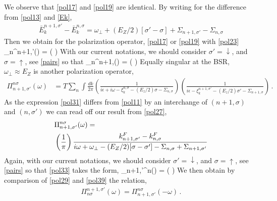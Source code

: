 We observe that \eqref{pol17} and \eqref{pol19} are identical.
By writing for the difference from \eqref{pol13} and \eqref{Ek},
\begin{align}\label{pol23}
\bar{E}_k^{n+1,\sigma'} - \bar{E}_k^{n,\sigma}  = \omega_{\perp} + (E_Z/2)[ \sigma' - \sigma ]
+
\Sigma_{n+1,\sigma'} - \Sigma_{n,\sigma}
\end{align}
Then we obtain for the polarization operator, \eqref{pol17} or \eqref{pol19} with \eqref{pol23}
\be\label{pol27}
\Pi_{n\sigma}^{n+1,\sigma'}(\omega) = \left(  \right)
\ee
With our current notations, we should consider $\sigma' = \downarrow$, and $\sigma = \uparrow$, see \eqref{pairs} so that 
\be\label{pol29}
\Pi_{n\uparrow}^{n+1,\downarrow}(\omega) = \left(  \right)
\ee
Equally singular at the BSR, $\omega_{\perp} \approx E_Z$ is another polarization operator, 
\begin{align}\label{pol31}
\Pi_{n+1,\sigma'}^{n\sigma}(\omega) &= T \sum_n \int \frac{dk}{2 \pi}\left(\frac{ 1 }{ i \epsilon + i \omega - \xi_k^{n,\sigma}- (E_z/2) \sigma  - \Sigma_{n,\sigma} } \right) 
\left(
\frac{ 1 }{ i \epsilon  - \xi_k^{n+1,\sigma'} - (E_z/2) \sigma' - \Sigma_{n+1,\sigma}} 
\right)\, .
\end{align}
As the expression \eqref{pol31} differs from \eqref{pol11} by an interchange of $(n+1,\sigma)$ and $(n,\sigma')$ we can read off our result from \eqref{pol27},
\begin{align}
\label{pol33}
&\Pi_{n+1,\sigma'}^{n\sigma}(\omega) = \notag \\
&\left( \frac{1}{ \pi} \right)
\frac{ k^F_{n+1,\sigma'} - k^F_{n,\sigma}   }{
i \omega + \omega_{\perp} - (E_Z/2)[ \sigma - \sigma' ]
-
\Sigma_{n,\sigma} + \Sigma_{n+1,\sigma'}
}
\end{align}
Again, with our current notations, we should consider $\sigma' = \downarrow$, and $\sigma = \uparrow$, see \eqref{pairs} so that \eqref{pol33} takes the form,
\be\label{pol39}
\Pi_{n+1,\sigma'}^{n\sigma}(\omega) = \left(  \right)
\ee
We then obtain by comparison of \eqref{pol29} and \eqref{pol39} the relation,
\begin{align}\label{pol41}
\Pi_{n\sigma}^{n+1,\sigma'}(\omega) =\Pi_{n+1,\sigma'}^{n\sigma}(-\omega) \, .
\end{align}
%
